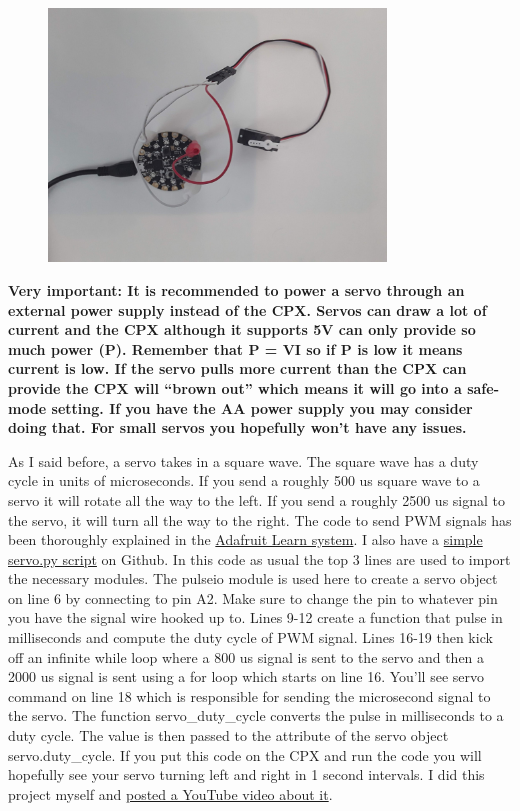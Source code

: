 \begin{figure}[H]
  \begin{center}
    \includegraphics[width=0.8\textwidth]{Figures/servo_circuit.jpeg}
  \end{center}
\end{figure}
{\bf Very important: It is recommended to power a servo through an external power supply instead of the CPX. Servos can draw a lot of current and the CPX although it supports 5V can only provide so much power (P). Remember that P = VI so if P is low it means current is low. If the servo pulls more current than the CPX can provide the CPX will “brown out” which means it will go into a safe-mode setting. If you have the AA power supply you may consider doing that. For small servos you hopefully won’t have any issues.}

    As I said before, a servo takes in a square wave. The square wave has a duty cycle in units of microseconds. If you send a roughly 500 us square wave to a servo it will rotate all the way to the left. If you send a roughly 2500 us signal to the servo, it will turn all the way to the right. The code to send PWM signals has been thoroughly explained in the \href{https://learn.adafruit.com/using-servos-with-circuitpython/overview}{Adafruit Learn system}. I also have a \href{https://github.com/cmontalvo251/Microcontrollers/blob/master/Circuit_Playground/CircuitPython/Servo/servo.py}{simple servo.py script} on Github. In this code as usual the top 3 lines are used to import the necessary modules. The pulseio module is used here to create a servo object on line 6 by connecting to pin A2. Make sure to change the pin to whatever pin you have the signal wire hooked up to. Lines 9-12 create a function that pulse in milliseconds and compute the duty cycle of PWM signal. Lines 16-19 then kick off an infinite while loop where a 800 us signal is sent to the servo and then a 2000 us signal is sent using a for loop which starts on line 16. You’ll see servo command on line 18 which is responsible for sending the microsecond signal to the servo. The function servo\_duty\_cycle converts the pulse in milliseconds to a duty cycle. The value is then passed to the attribute of the servo object servo.duty\_cycle. If you put this code on the CPX and run the code you will hopefully see your servo turning left and right in 1 second intervals. I did this project myself and \href{https://youtu.be/ynlGiPZk5VM}{posted a YouTube video about it}. 


